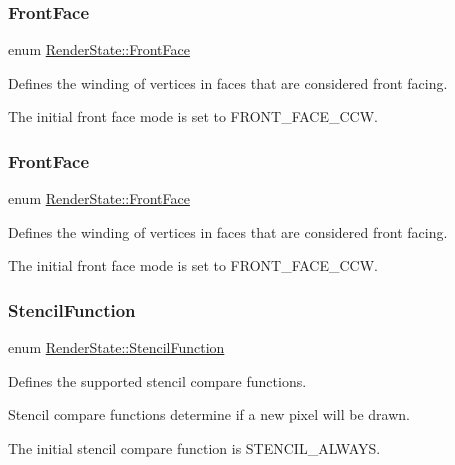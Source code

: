 \subsubsection{\texorpdfstring{Front\+Face}{FrontFace}\hspace{0.1cm}{\footnotesize\ttfamily [1/2]}}
{\footnotesize\ttfamily enum \hyperlink{classRenderState_ac748310042b020a92ea97ede898be30e}{Render\+State\+::\+Front\+Face}}

Defines the winding of vertices in faces that are considered front facing.

The initial front face mode is set to F\+R\+O\+N\+T\+\_\+\+F\+A\+C\+E\+\_\+\+C\+CW. \mbox{\label{classRenderState_ac748310042b020a92ea97ede898be30e}} 
\subsubsection{\texorpdfstring{Front\+Face}{FrontFace}\hspace{0.1cm}{\footnotesize\ttfamily [2/2]}}
{\footnotesize\ttfamily enum \hyperlink{classRenderState_ac748310042b020a92ea97ede898be30e}{Render\+State\+::\+Front\+Face}}

Defines the winding of vertices in faces that are considered front facing.

The initial front face mode is set to F\+R\+O\+N\+T\+\_\+\+F\+A\+C\+E\+\_\+\+C\+CW. \mbox{\label{classRenderState_a81cc5aa349c93afd42db28eea9de0165}} 
\subsubsection{\texorpdfstring{Stencil\+Function}{StencilFunction}\hspace{0.1cm}{\footnotesize\ttfamily [1/2]}}
{\footnotesize\ttfamily enum \hyperlink{classRenderState_a81cc5aa349c93afd42db28eea9de0165}{Render\+State\+::\+Stencil\+Function}}

Defines the supported stencil compare functions.

Stencil compare functions determine if a new pixel will be drawn.

The initial stencil compare function is S\+T\+E\+N\+C\+I\+L\+\_\+\+A\+L\+W\+A\+YS. \mbox{\label{classRenderState_a81cc5aa349c93afd42db28eea9de0165}} 
